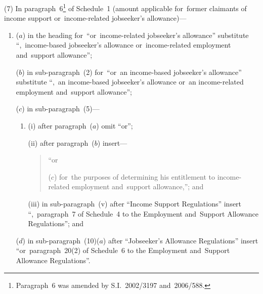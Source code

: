 \documentclass[12pt,a4paper]{article}
\begin{document}
(7) In paragraph~6\footnote{Paragraph~6 was amended by S.I.~2002/3197 and~2006/588.} of Schedule~1 (amount applicable for~former claimants of income support or~income-related jobseeker’s allowance)—
\begin{enumerate}\item[]
($a$) in the heading for~“or~income-related jobseeker’s allowance” substitute “,~income-based jobseeker’s allowance or~income-related employment and~support allowance”;

($b$) in sub-paragraph~(2) for~“or~an income-based jobseeker’s allowance” substitute “,~an income-based jobseeker’s allowance or~an income-related employment and~support allowance”;

($c$) in sub-paragraph~(5)—
\begin{enumerate}\item[]
(i) after paragraph~($a$)  omit “or”;

(ii) after paragraph~($b$)  insert—
\begin{quotation}
“or

($c$) for~the purposes of determining his entitlement to income-related employment and~support allowance,”; and
\end{quotation}

(iii) in sub-paragraph~(v)  after “Income Support Regulations” insert “,~paragraph~7 of Schedule~4 to the Employment and~Support Allowance Regulations”; and
\end{enumerate}

($d$) in sub-paragraph~(10)($a$)  after “Jobseeker’s Allowance Regulations” insert “or~paragraph~20(2) of Schedule~6 to the Employment and~Support Allowance Regulations”.
\end{enumerate}
\end{document}
